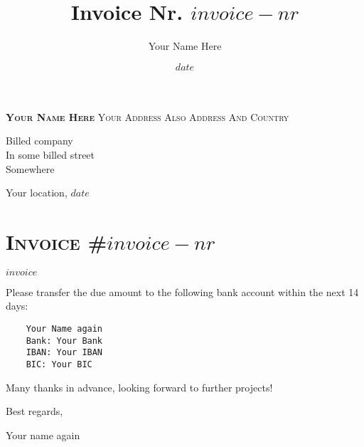 \documentclass[11pt]{article}
\title{Invoice Nr. $invoice-nr$}
\author{Your Name Here}
\date{$date$}
\begin{document}
\small
\noindent
\textsc{\textbf{Your Name Here}}
\textbullet{} \textsc{Your Address}
\textbullet{} \textsc{Also Address}
\textbullet{} \textsc{And Country}

\normalsize \sffamily
\vspace{1em}
\noindent
Billed company\\
In some billed street\\
Somewhere

\vspace{1em}

\begin{flushright}
  \small
  Your location, $date$
\end{flushright}

\vspace{1em}


\section*{\textsc{Invoice} \textsc{\#$invoice-nr$}}
\footnotesize

\noindent
$invoice$

\vspace{15mm}

\sffamily
\small

\noindent
Please transfer the due amount to the following bank account within the next 14 days:

\vspace{1em}

\begin{verbatim}
    Your Name again
    Bank: Your Bank
    IBAN: Your IBAN
    BIC: Your BIC
\end{verbatim}

\noindent
Many thanks in advance, looking forward to further projects!\\

\medskip

\noindent
Best regards,

\vspace{1em}

\noindent
Your name again
\end{document}
